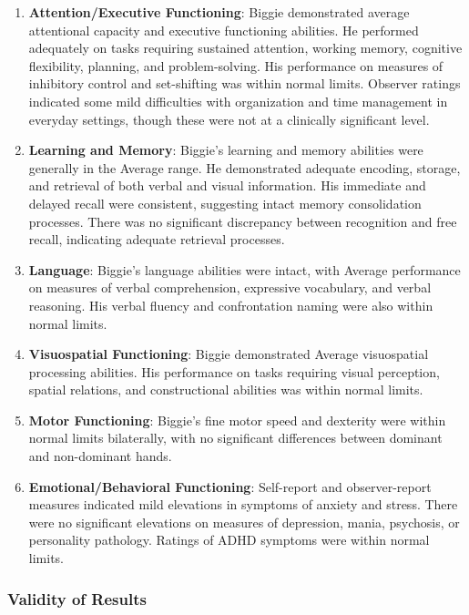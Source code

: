 \documentclass[
  letterpaper,
  DIV=11,
  numbers=noendperiod]{scrartcl}
\begin{document}
\begin{enumerate}
\def\labelenumi{\arabic{enumi}.}
\item
  \textbf{Attention/Executive Functioning}: Biggie demonstrated average
  attentional capacity and executive functioning abilities. He performed
  adequately on tasks requiring sustained attention, working memory,
  cognitive flexibility, planning, and problem-solving. His performance
  on measures of inhibitory control and set-shifting was within normal
  limits. Observer ratings indicated some mild difficulties with
  organization and time management in everyday settings, though these
  were not at a clinically significant level.
\item
  \textbf{Learning and Memory}: Biggie's learning and memory abilities
  were generally in the Average range. He demonstrated adequate
  encoding, storage, and retrieval of both verbal and visual
  information. His immediate and delayed recall were consistent,
  suggesting intact memory consolidation processes. There was no
  significant discrepancy between recognition and free recall,
  indicating adequate retrieval processes.
\item
  \textbf{Language}: Biggie's language abilities were intact, with
  Average performance on measures of verbal comprehension, expressive
  vocabulary, and verbal reasoning. His verbal fluency and confrontation
  naming were also within normal limits.
\item
  \textbf{Visuospatial Functioning}: Biggie demonstrated Average
  visuospatial processing abilities. His performance on tasks requiring
  visual perception, spatial relations, and constructional abilities was
  within normal limits.
\item
  \textbf{Motor Functioning}: Biggie's fine motor speed and dexterity
  were within normal limits bilaterally, with no significant differences
  between dominant and non-dominant hands.
\item
  \textbf{Emotional/Behavioral Functioning}: Self-report and
  observer-report measures indicated mild elevations in symptoms of
  anxiety and stress. There were no significant elevations on measures
  of depression, mania, psychosis, or personality pathology. Ratings of
  ADHD symptoms were within normal limits.
\end{enumerate}

\subsubsection{Validity of Results}\label{validity-of-results}
\end{document}
